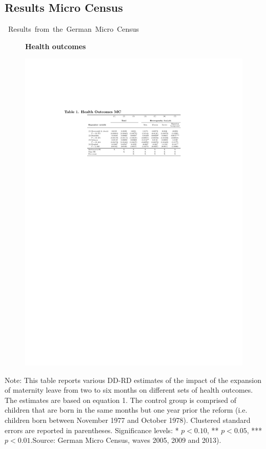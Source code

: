 \documentclass[usenames,dvipsnames]{beamer} %
\begin{document}
\subsection*{Results Micro Census}
\label{MZ}
\begin{frame}{\mbox{ Results from the German Micro Census}}
\begin{figure} \begin{center}
\textbf{Health outcomes}
\end{center} 
\includegraphics[width = 0.99\linewidth]{../../analysis/graphs/KKH/outcome_MZ_health.pdf}
\end{figure}\vspace{-2.5em}
\tiny \flushleft Note: This table reports various DD-RD estimates of the impact of the expansion of maternity leave from two to six months on different sets of health outcomes. The estimates are based on equation 1. The control group is comprised of children that are born in the same months but one year prior the reform (i.e. children born between  November 1977 and October 1978). Clustered standard errors are reported in parentheses. Significance levels: * \(p<0.10\), ** \(p<0.05\), *** \(p<0.01\).\newline Source: German Micro Census, waves 2005, 2009 and 2013). 
\hyperlink{BACK_FROM_MZ}{}
\end{frame}
\end{document}
